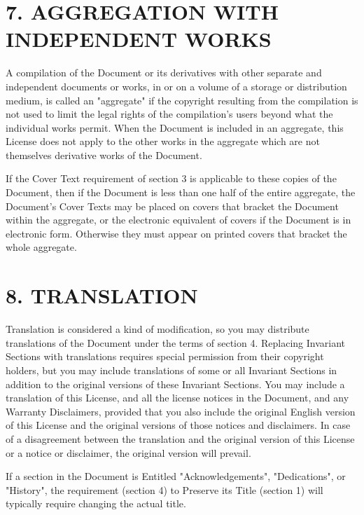 \section{7. AGGREGATION WITH INDEPENDENT WORKS}
A compilation of the Document or its derivatives with other separate and independent documents or works, in or on a volume of a storage or distribution medium, is called an "aggregate" if the copyright resulting from the compilation is not used to limit the legal rights of the compilation's users beyond what the individual works permit. When the Document is included in an aggregate, this License does not apply to the other works in the aggregate which are not themselves derivative works of the Document.\par
If the Cover Text requirement of section 3 is applicable to these copies of the Document, then if the Document is less than one half of the entire aggregate, the Document's Cover Texts may be placed on covers that bracket the Document within the aggregate, or the electronic equivalent of covers if the Document is in electronic form. Otherwise they must appear on printed covers that bracket the whole aggregate.
\section{8. TRANSLATION}
Translation is considered a kind of modification, so you may distribute translations of the Document under the terms of section 4. Replacing Invariant Sections with translations requires special permission from their copyright holders, but you may include translations of some or all Invariant Sections in addition to the original versions of these Invariant Sections. You may include a translation of this License, and all the license notices in the Document, and any Warranty Disclaimers, provided that you also include the original English version of this License and the original versions of those notices and disclaimers. In case of a disagreement between the translation and the original version of this License or a notice or disclaimer, the original version will prevail.\par
If a section in the Document is Entitled "Acknowledgements", "Dedications", or "History", the requirement (section 4) to Preserve its Title (section 1) will typically require changing the actual title.
